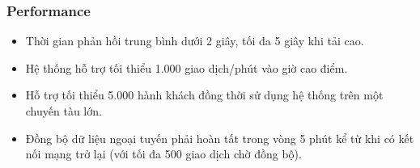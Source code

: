 \subsubsection{Performance}
\begin{itemize}
    \item Thời gian phản hồi trung bình dưới 2 giây, tối đa 5 giây khi
    tải cao.
    \item Hệ thống hỗ trợ tối thiểu 1.000 giao dịch/phút vào giờ cao
    điểm.
    \item Hỗ trợ tối thiểu 5.000 hành khách đồng thời sử dụng hệ thống
    trên một chuyến tàu lớn.
    \item Đồng bộ dữ liệu ngoại tuyến phải hoàn tất trong vòng 5 phút kể
    từ khi có kết nối mạng trở lại (với tối đa 500 giao dịch chờ đồng
    bộ).
\end{itemize}
